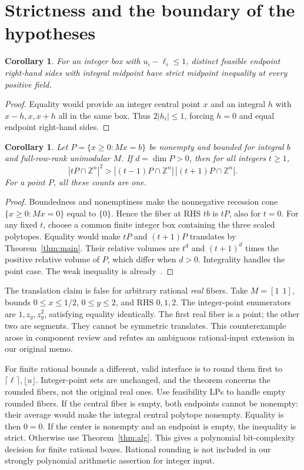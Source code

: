 \documentclass[11pt]{article}
\newtheorem{corollary}[theorem]{Corollary}
\newcommand{\Z}{\mathbb Z}\newcommand{\R}{\mathbb R}\newcommand{\C}{\mathbb C}
\begin{document}
\section{Strictness and the boundary of the hypotheses}
\begin{corollary}\label{cor:binary}
For an integer box with \(u_i-\ell_i\le1\), distinct feasible endpoint right-hand sides with integral midpoint have strict midpoint inequality at every positive field.
\end{corollary}
\begin{proof}
Equality would provide an integer central point \(x\) and an integral \(h\) with \(x-h,x,x+h\) all in the same box. Thus \(2|h_i|\le1\), forcing \(h=0\) and equal endpoint right-hand sides.
\end{proof}

\begin{corollary}\label{cor:ehrhart}
Let \(P=\{x\ge0:Mx=b\}\) be nonempty and bounded for integral \(b\) and full-row-rank unimodular \(M\).
If \(d=\dim P>0\), then for all integers \(t\ge1\),
\[
|tP\cap\Z^n|^2>
|(t-1)P\cap\Z^n|\,|(t+1)P\cap\Z^n|.
\]
For a point \(P\), all these counts are one.
\end{corollary}
\begin{proof}
Boundedness and nonemptiness make the nonnegative recession cone \(\{x\ge0:Mx=0\}\) equal to \(\{0\}\). Hence the fiber at RHS \(tb\) is \(tP\), also for \(t=0\). For any fixed \(t\), choose a common finite integer box containing the three scaled polytopes. Equality would make \(tP\) and \((t+1)P\) translates by Theorem~\ref{thm:main}. Their relative volumes are \(t^d\) and \((t+1)^d\) times the positive relative volume of \(P\), which differ when \(d>0\). Integrality handles the point case. The weak inequality is already~\cite[Corollary 3.5]{LMY}.
\end{proof}

The translation claim is false for arbitrary rational \emph{real} fibers.
Take \(M=[1\ \ 1]\), bounds \(0\le x\le1/2\), \(0\le y\le2\), and RHS \(0,1,2\). The integer-point enumerators are \(1,z_y,z_y^2\), satisfying equality identically. The first real fiber is a point; the other two are segments. They cannot be symmetric translates. This counterexample arose in component review and refutes an ambiguous rational-input extension in our original memo.

For finite rational bounds a different, valid interface is to round them first to \(\lceil\ell\rceil,\lfloor u\rfloor\). Integer-point sets are unchanged, and the theorem concerns the rounded fibers, not the original real ones. Use feasibility LPs to handle empty rounded fibers. If the central fiber is empty, both endpoints cannot be nonempty: their average would make the integral central polytope nonempty. Equality is then \(0=0\). If the center is nonempty and an endpoint is empty, the inequality is strict. Otherwise use Theorem~\ref{thm:alg}. This gives a polynomial bit-complexity decision for finite rational boxes. Rational rounding is not included in our strongly polynomial arithmetic assertion for integer input.
\end{document}
